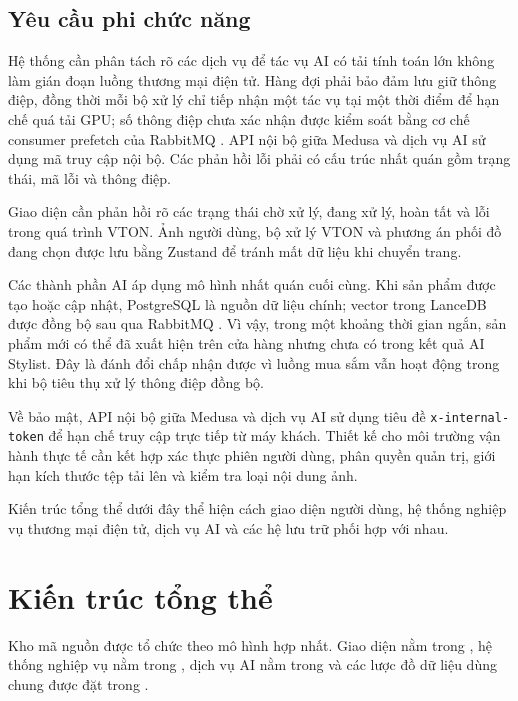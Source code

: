 \subsection{Yêu cầu phi chức năng}

Hệ thống cần phân tách rõ các dịch vụ để tác vụ AI có tải tính toán lớn không làm gián đoạn luồng thương mại điện tử. Hàng đợi phải bảo đảm lưu giữ thông điệp, đồng thời mỗi bộ xử lý chỉ tiếp nhận một tác vụ tại một thời điểm để hạn chế quá tải GPU; số thông điệp chưa xác nhận được kiểm soát bằng cơ chế consumer prefetch của RabbitMQ \cite{rabbitmq-prefetch}. API nội bộ giữa Medusa và dịch vụ AI sử dụng mã truy cập nội bộ. Các phản hồi lỗi phải có cấu trúc nhất quán gồm trạng thái, mã lỗi và thông điệp.

\medskip

Giao diện cần phản hồi rõ các trạng thái chờ xử lý, đang xử lý, hoàn tất và lỗi trong quá trình VTON. Ảnh người dùng, bộ xử lý VTON và phương án phối đồ đang chọn được lưu bằng Zustand để tránh mất dữ liệu khi chuyển trang.

\medskip

Các thành phần AI áp dụng mô hình nhất quán cuối cùng. Khi sản phẩm được tạo hoặc cập nhật, PostgreSQL là nguồn dữ liệu chính; vector trong LanceDB được đồng bộ sau qua RabbitMQ \cite{lancedb,rabbitmq,postgresql}. Vì vậy, trong một khoảng thời gian ngắn, sản phẩm mới có thể đã xuất hiện trên cửa hàng nhưng chưa có trong kết quả AI Stylist. Đây là đánh đổi chấp nhận được vì luồng mua sắm vẫn hoạt động trong khi bộ tiêu thụ xử lý thông điệp đồng bộ.

\medskip

Về bảo mật, API nội bộ giữa Medusa và dịch vụ AI sử dụng tiêu đề \mbox{\texttt{x-internal-token}} để hạn chế truy cập trực tiếp từ máy khách. Thiết kế cho môi trường vận hành thực tế cần kết hợp xác thực phiên người dùng, phân quyền quản trị, giới hạn kích thước tệp tải lên và kiểm tra loại nội dung ảnh.

\medskip

Kiến trúc tổng thể dưới đây thể hiện cách giao diện người dùng, hệ thống nghiệp vụ thương mại điện tử, dịch vụ AI và các hệ lưu trữ phối hợp với nhau.

\section{Kiến trúc tổng thể}

Kho mã nguồn được tổ chức theo mô hình hợp nhất. Giao diện nằm trong , hệ thống nghiệp vụ nằm trong , dịch vụ AI nằm trong  và các lược đồ dữ liệu dùng chung được đặt trong .

